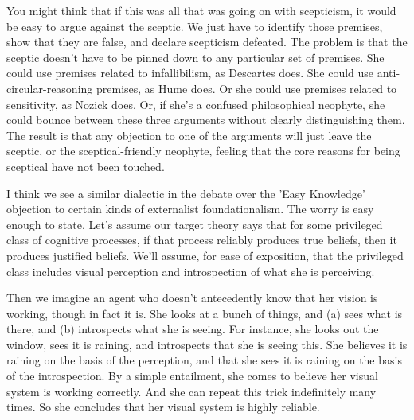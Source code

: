You might think that if this was all that was going on with scepticism, it would be easy to argue against the sceptic. We just have to identify those premises, show that they are false, and declare scepticism defeated. The problem is that the sceptic doesn't have to be pinned down to any particular set of premises. She could use premises related to infallibilism, as Descartes does. She could use anti-circular-reasoning premises, as Hume does. Or she could use premises related to sensitivity, as Nozick does. Or, if she's a confused philosophical neophyte, she could bounce between these three arguments without clearly distinguishing them. The result is that any objection to one of the arguments will just leave the sceptic, or the sceptical-friendly neophyte, feeling that the core reasons for being sceptical have not been touched.

I think we see a similar dialectic in the debate over the 'Easy Knowledge' objection to certain kinds of externalist foundationalism. The worry is easy enough to state. Let's assume our target theory says that for some privileged class of cognitive processes, if that process reliably produces true beliefs, then it produces justified beliefs. We'll assume, for ease of exposition, that the privileged class includes visual perception and introspection of what she is perceiving. 

Then we imagine an agent who doesn't antecedently know that her vision is working, though in fact it is. She looks at a bunch of things, and (a) sees what is there, and (b) introspects what she is seeing. For instance, she looks out the window, sees it is raining, and introspects that she is seeing this. She believes it is raining on the basis of the perception, and that she sees it is raining on the basis of the introspection. By a simple entailment, she comes to believe her visual system is working correctly. And she can repeat this trick indefinitely many times. So she concludes that her visual system is highly reliable.

